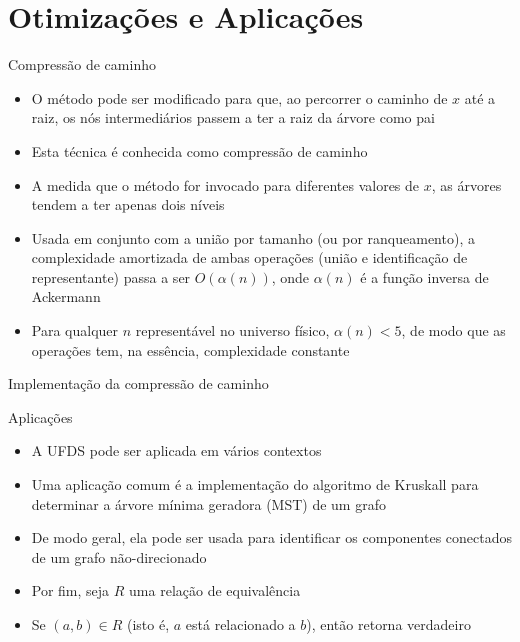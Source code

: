 \section{Otimizações e Aplicações}

\begin{frame}[fragile]{Compressão de caminho}

    \begin{itemize}
        \item O método  pode ser modificado para que, ao percorrer o
            caminho de $x$ até a raiz, os nós intermediários passem a ter a raiz da árvore 
            como pai

        \item Esta técnica é conhecida como compressão de caminho

        \item A medida que o método for invocado para diferentes valores de $x$, as árvores tendem
            a ter apenas dois níveis

        \item Usada em conjunto com a união por tamanho (ou por ranqueamento), a complexidade 
            amortizada de
            ambas operações (união e identificação de representante) passa a ser $O(\alpha(n))$,
            onde $\alpha(n)$ é a função inversa de Ackermann

        \item Para qualquer $n$ representável no universo físico, $\alpha(n) < 5$, de modo que
            as operações tem, na essência, complexidade constante
    \end{itemize}

\end{frame}



\begin{frame}[fragile]{Implementação da compressão de caminho}
\end{frame}

\begin{frame}[fragile]{Aplicações}

    \begin{itemize}
        \item A UFDS pode ser aplicada em vários contextos

        \item Uma aplicação comum é a implementação do algoritmo de Kruskall para determinar a
            árvore mínima geradora (MST) de um grafo

        \item De modo geral, ela pode ser usada para identificar os componentes conectados de
            um grafo não-direcionado

        \item Por fim, seja $R$ uma relação de equivalência

        \item Se $(a, b)\in R$ (isto é, $a$ está relacionado a $b$), então 
             retorna verdadeiro
    \end{itemize}

\end{frame}
